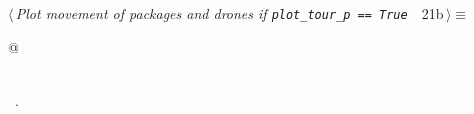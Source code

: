 \documentclass[10pt, english, oneside]{report}
\begin{document}
\begin{flushleft} \small
\begin{minipage}{\linewidth}\label{scrap21}\raggedright\small
{} $\langle\,${\itshape Plot movement of packages and drones if \verb|plot_tour_p == True |}\nobreak\ {\footnotesize {21b}}$\,\rangle\equiv$
\vspace{-1ex}
\begin{list}{}{} \item
\mbox{}\verb@   @\\
\mbox{}\verb@pass@\\
\mbox{}\verb@@{\NWsep}
\end{list}
\vspace{-1.5ex}
\footnotesize
\begin{list}{}{\setlength{\itemsep}{-\parsep}\setlength{\itemindent}{-\leftmargin}}
\item \NWtxtMacroRefIn\ .

\item{}
\end{list}
\end{minipage}\vspace{4ex}
\end{flushleft}
\end{document}
